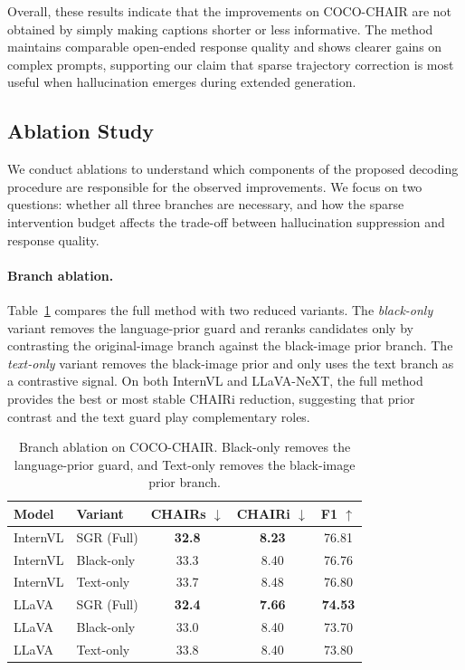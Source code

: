 \documentclass[11pt]{article}
\begin{document}
  Overall, these results indicate that the improvements on COCO-CHAIR are not obtained by simply making captions shorter or less informative.
  The method maintains comparable open-ended response quality and shows clearer gains on complex prompts, supporting our claim that sparse trajectory correction is most
  useful when hallucination emerges during extended generation.


  \subsection{Ablation Study}

  We conduct ablations to understand which components of the proposed decoding procedure are responsible for the observed improvements.
  We focus on two questions: whether all three branches are necessary, and how the sparse intervention budget affects the trade-off between hallucination suppression and
  response quality.

  \paragraph{Branch ablation.}
  Table~\ref{tab:branch_ablation} compares the full method with two reduced variants.
  The \textit{black-only} variant removes the language-prior guard and reranks candidates only by contrasting the original-image branch against the black-image prior branch.
  The \textit{text-only} variant removes the black-image prior and only uses the text branch as a contrastive signal.
  On both InternVL and LLaVA-NeXT, the full method provides the best or most stable CHAIRi reduction, suggesting that prior contrast and the text guard play complementary roles.

 \begin{table}[H]
    \centering
    \small
    \setlength{\tabcolsep}{3.5pt}
    \begin{tabular}{llccc}
    \hline
    Model & Variant & CHAIRs $\downarrow$ & CHAIRi $\downarrow$ & F1 $\uparrow$ \\
    \hline
    InternVL & SGR (Full) & \textbf{32.8} & \textbf{8.23} & 76.81 \\
    InternVL & Black-only & 33.3 & 8.40 & 76.76 \\
    InternVL & Text-only & 33.7 & 8.48 & 76.80 \\
    \hline
    LLaVA & SGR (Full) & \textbf{32.4} & \textbf{7.66} & \textbf{74.53} \\
    LLaVA & Black-only & 33.0 & 8.40 & 73.70 \\
    LLaVA & Text-only & 33.8 & 8.40 & 73.80 \\
    \hline
    \end{tabular}
    \caption{
    Branch ablation on COCO-CHAIR.
    Black-only removes the language-prior guard, and Text-only removes the black-image prior branch.
    }
    \label{tab:branch_ablation}
  \end{table}
\end{document}
